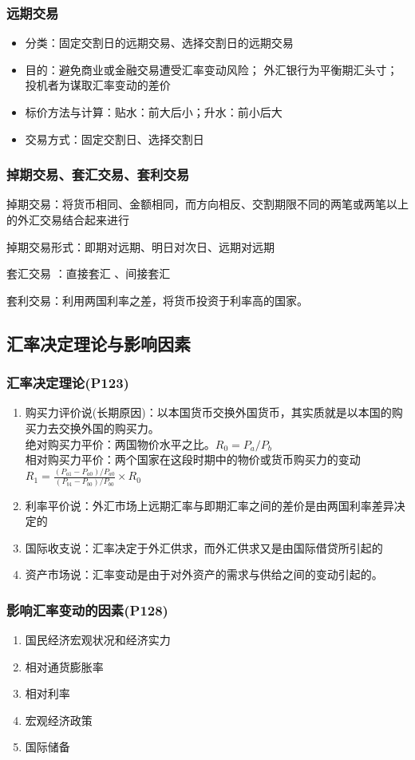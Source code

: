 \documentclass{article}
\begin{document}
\subsubsection*{远期交易}
\begin{itemize}
    \item 分类：固定交割日的远期交易、选择交割日的远期交易 
    \item 目的：避免商业或金融交易遭受汇率变动风险；
    外汇银行为平衡期汇头寸；
    投机者为谋取汇率变动的差价 
    \item 标价方法与计算：贴水：前大后小；升水：前小后大
    \item 交易方式：固定交割日、选择交割日
\end{itemize}
\subsubsection*{掉期交易、套汇交易、套利交易}
掉期交易：将货币相同、金额相同，而方向相反、交割期限不同的两笔或两笔以上的外汇交易结合起来进行

掉期交易形式：即期对远期、明日对次日、远期对远期

套汇交易 ：直接套汇 、间接套汇

套利交易：利用两国利率之差，将货币投资于利率高的国家。
\subsection*{汇率决定理论与影响因素}
\subsubsection*{汇率决定理论(P123)}
\begin{enumerate}
    \item 购买力评价说(长期原因)：以本国货币交换外国货币，其实质就是以本国的购买力去交换外国的购买力。\\
    绝对购买力平价：两国物价水平之比。$R_0=P_a/P_b$\\
    相对购买力平价：两个国家在这段时期中的物价或货币购买力的变动$R_1=\frac{(P_{a1}-P_{a0})/P_{a0}}{(P_{b1}-P_{b0})/P_{b0}}\times R_0$
    \item 利率平价说：外汇市场上远期汇率与即期汇率之间的差价是由两国利率差异决定的
    \item 国际收支说：汇率决定于外汇供求，而外汇供求又是由国际借贷所引起的
    \item 资产市场说：汇率变动是由于对外资产的需求与供给之间的变动引起的。
\end{enumerate}
\subsubsection*{影响汇率变动的因素(P128)}
\begin{enumerate}
    \item 国民经济宏观状况和经济实力
    \item 相对通货膨胀率
    \item 相对利率
    \item 宏观经济政策
    \item 国际储备
\end{enumerate}
\end{document}

